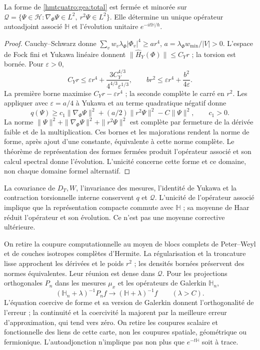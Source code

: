 \begin{theorem}
\label{hmtcuatro:gea:forma} La forme de \eqref{hmtcuatro:gea:total} est fermée et minorée sur $\mathcal Q=\{\Psi\in\mathscr H:\nabla_\Phi\Psi\in L^2,\
r^2\Psi\in L^2\}$. Elle détermine un unique opérateur autoadjoint associé $\mathbb H$ et l’évolution unitaire $e^{-it\mathbb H/\hbar}$.
\end{theorem}
\begin{proof}
Cauchy--Schwarz donne $\sum_vw_v\lambda_\Phi|\Phi_v|^4\geq ar^4$, $a=\lambda_\Phi w_{\min}/|V|>0$. L’espace de Fock fini et Yukawa linéaire donnent $\|\widehat H_Y(\Phi)\|\leq C_Yr$ ; la torsion est bornée. Pour $\varepsilon>0$,
\[
C_Yr\leq\varepsilon r^4+
\frac{3C_Y^{4/3}}{4^{4/3}\varepsilon^{1/3}},\qquad
br^2\leq\varepsilon r^4+\frac{b^2}{4\varepsilon}.
\]
La première borne maximise $C_Yr-\varepsilon r^4$ ; la seconde complète le carré en $r^2$. Les appliquer avec $\varepsilon=a/4$ à Yukawa et au terme quadratique négatif donne
\[
q(\Psi)\geq c_1\|\nabla_\Phi\Psi\|^2+
(a/2)\|r^2\Psi\|^2-C\|\Psi\|^2,\qquad c_1>0.
\]
La norme $\|\Psi\|^2+\|\nabla_\Phi\Psi\|^2+\|r^2\Psi\|^2$ est complète par fermeture de la dérivée faible et de la multiplication. Ces bornes et les majorations rendent la norme de forme, après ajout d’une constante, équivalente à cette norme complète. Le théorème de représentation des formes fermées produit l’opérateur associé et son calcul spectral donne l’évolution. L’unicité concerne cette forme et ce domaine, non chaque domaine formel alternatif.
\end{proof}

La covariance de $D_T,W$, l’invariance des mesures, l’identité de Yukawa et la contraction torsionnelle interne conservent $q$ et $\mathcal Q$. L’unicité de l’opérateur associé implique que la représentation compacte commute avec $\mathbb H$ ; sa moyenne de Haar réduit l’opérateur et son évolution. Ce n’est pas une moyenne corrective ultérieure.

On retire la coupure computationnelle au moyen de blocs complets de Peter--Weyl et de couches isotropes complètes d’Hermite. La régularisation et la troncature lisse approchent les dérivées et le poids $r^2$ ; les densités bornées préservent des normes équivalentes. Leur réunion est dense dans $\mathcal Q$. Pour les projections orthogonales $P_n$ dans les mesures $\mu_x$ et les opérateurs de Galerkin $\mathbb H_n$,
\[
(\mathbb H_n+\lambda)^{-1}P_nf\longrightarrow
(\mathbb H+\lambda)^{-1}f\qquad(\lambda>C).
\]
L’équation coercive de forme et sa version de Galerkin donnent l’orthogonalité de l’erreur ; la continuité et la coercivité la majorent par la meilleure erreur d’approximation, qui tend vers zéro. On retire les coupures scalaire et fonctionnelle des liens de cette carte, non les coupures spatiale, géométrique ou fermionique. L’autoadjonction n’implique pas non plus que $e^{-t\mathbb H}$ soit à trace.

